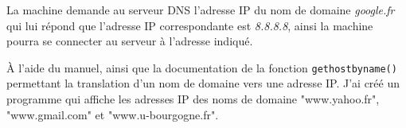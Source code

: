La machine demande au serveur DNS l'adresse IP du nom de domaine \textit{google.fr} qui lui répond que l'adresse IP correspondante est \textit{8.8.8.8}, ainsi la machine pourra se connecter au serveur à l'adresse indiqué.

À l’aide du manuel, ainsi que la documentation de la fonction \texttt{gethostbyname()} permettant la translation d’un nom de domaine vers une adresse IP. J'ai créé un programme qui affiche les adresses IP des noms de domaine "www.yahoo.fr", "www.gmail.com" et "www.u-bourgogne.fr".

\inputminted[linenos,firstline=10,lastline=36]{cpp}{../sources/cpp/TP7-8/getHostByName.c}

